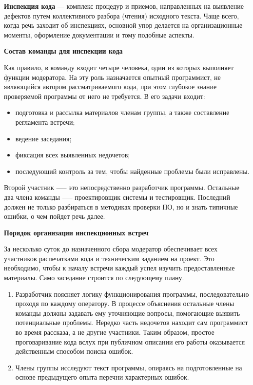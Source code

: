 \documentclass{article}[14pt]
\begin{document}
\textbf{Инспекция кода} --- комплекс процедур и приемов, направленных на выявление дефектов путем коллективного разбора 
(чтения) исходного текста. Чаще всего, когда речь заходит об инспекциях, основной упор делается на организационные моменты, 
оформление документации и тому подобные аспекты.

\bigskip

\noindent \textbf{Состав команды для инспекции кода}

Как правило, в команду входит четыре человека, один из которых выполняет функции модератора. На эту роль 
назначается опытный программист, не являющийся автором рассматриваемого кода, при этом глубокое знание проверяемой 
программы от него не требуется. В его задачи входит:

\begin{itemize}
    \item подготовка и рассылка материалов членам группы, а также составление регламента встречи;
    \item ведение заседания;
    \item фиксация всех выявленных недочетов;
    \item последующий контроль за тем, чтобы найденные проблемы были исправлены.
\end{itemize}

Второй участник —-- это непосредственно разработчик программы. Остальные два члена команды —-- проектировщик системы 
и тестировщик. Последний должен не только разбираться в методиках проверки ПО, но и знать типичные ошибки, о чем пойдет 
речь далее.

\bigskip

\noindent \textbf{Порядок организации инспекционных встреч}

За несколько суток до назначенного сбора модератор обеспечивает всех участников распечатками кода и техническим 
заданием на проект. Это необходимо, чтобы к началу встречи каждый успел изучить предоставленные материалы. 
Само заседание строится по следующему плану.

\begin{enumerate}
    \item Разработчик поясняет логику функционирования программы, последовательно проходя по каждому оператору. 
    В процессе объяснения остальные члены команды должны задавать ему уточняющие вопросы, помогающие выявить 
    потенциальные проблемы. Нередко часть недочетов находит сам программист во время рассказа, а не другие участники. 
    Таким образом, простое проговаривание кода вслух при публичном описании его работы оказывается действенным способом 
    поиска ошибок.

    \item Члены группы исследуют текст программы, опираясь на подготовленные на основе предыдущего опыта перечни 
    характерных ошибок.
\end{enumerate}
\end{document}
